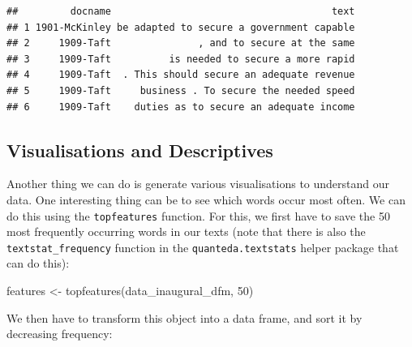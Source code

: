 \documentclass[
]{article}
\newenvironment{Shaded}{\begin{snugshade}}{\end{snugshade}}
\newcommand{\AttributeTok}[1]{\textcolor[rgb]{0.77,0.63,0.00}{#1}}
\newcommand{\DecValTok}[1]{\textcolor[rgb]{0.00,0.00,0.81}{#1}}
\newcommand{\FunctionTok}[1]{\textcolor[rgb]{0.00,0.00,0.00}{#1}}
\newcommand{\NormalTok}[1]{#1}
\newcommand{\OtherTok}[1]{\textcolor[rgb]{0.56,0.35,0.01}{#1}}
\newcommand{\SpecialCharTok}[1]{\textcolor[rgb]{0.00,0.00,0.00}{#1}}
\begin{document}
\begin{verbatim}
##         docname                                      text
## 1 1901-McKinley be adapted to secure a government capable
## 2     1909-Taft               , and to secure at the same
## 3     1909-Taft          is needed to secure a more rapid
## 4     1909-Taft  . This should secure an adequate revenue
## 5     1909-Taft     business . To secure the needed speed
## 6     1909-Taft    duties as to secure an adequate income
\end{verbatim}

\hypertarget{visualisations-and-descriptives}{%
\subsection{Visualisations and Descriptives}\label{visualisations-and-descriptives}}

Another thing we can do is generate various visualisations to understand our data. One interesting thing can be to see which words occur most often. We can do this using the \texttt{topfeatures} function. For this, we first have to save the 50 most frequently occurring words in our texts (note that there is also the \texttt{textstat\_frequency} function in the \texttt{quanteda.textstats} helper package that can do this):

\begin{Shaded}
\begin{Highlighting}[]
\NormalTok{features }\OtherTok{\textless{}{-}} \FunctionTok{topfeatures}\NormalTok{(data\_inaugural\_dfm, }\DecValTok{50}\NormalTok{)}
\end{Highlighting}
\end{Shaded}

We then have to transform this object into a data frame, and sort it by decreasing frequency:

\begin{Shaded}
\end{Shaded}
\end{document}
